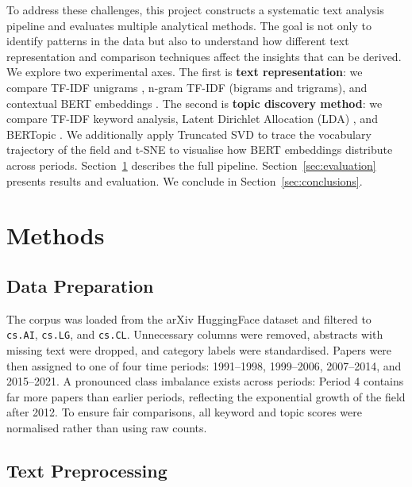 \documentclass{article}
\begin{document}
To address these challenges, this project constructs a
systematic text analysis pipeline and evaluates multiple
analytical methods. The goal is not only to identify
patterns in the data but also to understand how different
text representation and comparison techniques affect the
insights that can be derived. We explore two experimental
axes. The first is \textbf{text representation}: we compare
TF-IDF unigrams \citep{scikit-learn}, n-gram TF-IDF
(bigrams and trigrams), and contextual BERT embeddings
\citep{bge2023}. The second is \textbf{topic discovery
method}: we compare TF-IDF keyword analysis, Latent
Dirichlet Allocation (LDA) \citep{blei2003latent}, and
BERTopic \citep{grootendorst2022bertopic}. We additionally
apply Truncated SVD \citep{scikit-learn} to trace the
vocabulary trajectory of the field and t-SNE
\citep{vandermaaten2008} to visualise how BERT embeddings
distribute across periods.
Section~\ref{sec:methods} describes the full pipeline.
Section~\ref{sec:evaluation} presents results and
evaluation. We conclude in Section~\ref{sec:conclusions}.


\section{Methods}
\label{sec:methods}

\subsection{Data Preparation}

The corpus was loaded from the arXiv HuggingFace dataset
\citep{arxiv2020} and filtered to \texttt{cs.AI},
\texttt{cs.LG}, and \texttt{cs.CL}. Unnecessary columns
were removed, abstracts with missing text were dropped, and
category labels were standardised. Papers were then assigned
to one of four time periods: 1991--1998, 1999--2006,
2007--2014, and 2015--2021. A pronounced class imbalance
exists across periods: Period 4 contains far more papers
than earlier periods, reflecting the exponential growth of
the field after 2012. To ensure fair comparisons, all
keyword and topic scores were normalised rather than using
raw counts.

\subsection{Text Preprocessing}
\end{document}
